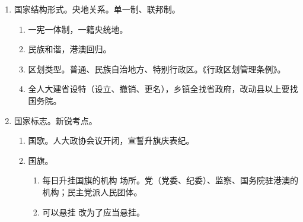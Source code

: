 \begin{enumerate}
\begin{enumerate}
                \begin{enumerate}
                  \item 补选。间选个别可人常，可等额可差额。
                  \item 罢免。都是向人常提罢免案。
                        \begin{enumerate}
                          \item 直选县 50 乡 30，原选区决定过半。
                          \item 间选主席过十一、主任过五一，各自过半，丢人要报告。
                        \end{enumerate}
                  \item 辞职。直选县找县，乡找乡，过半数 + 公告。间选回到原人常，过半数 + 通知。
                  \item 暂停。
                  \item 终止。
                \end{enumerate}
          \item 除现行犯的拘留是报告，其他都是报批。
          \item 费用列入财政预算，国库（政府在人民银行开设的公共账户）开支。
        \end{enumerate}
  \item 国家结构形式。央地关系。单一制、联邦制。
        \begin{enumerate}
          \item 一宪一体制，一籍央统地。
          \item 民族和谐，港澳回归。
          \item 区划类型。普通、民族自治地方、特别行政区。《行政区划管理条例》。
          \item 全人大建省设特（设立、撤销、更名），乡镇全找省政府，改动县以上要找国务院。
        \end{enumerate}
  \item 国家标志。新锐考点。
        \begin{enumerate}
          \item 国歌。人大政协会议开闭，宣誓升旗庆表纪。
          \item 国旗。
                \begin{enumerate}
                  \item 每日升挂国旗的机构 \hz 场所。党（党委、纪委）、监察、国务院驻港澳的机构；民主党派人民团体。
                  \item 可以悬挂 \yjt 改为了应当悬挂。
                \end{enumerate}

\end{enumerate}
\end{enumerate}
